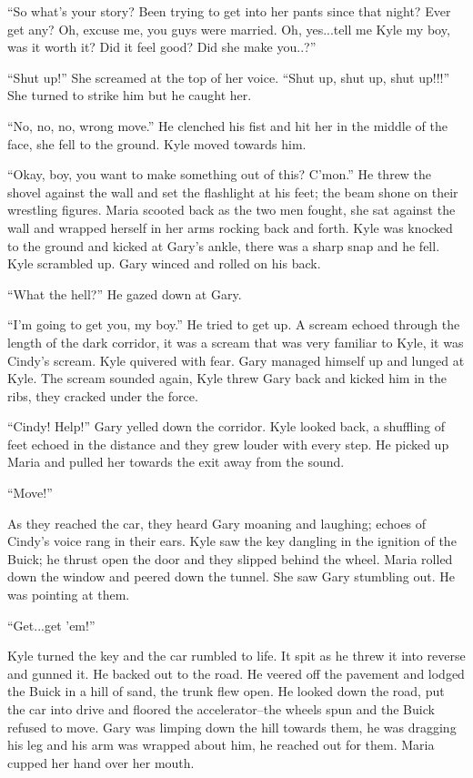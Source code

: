 ``So what's your story? Been trying to get into her pants since that
night? Ever get any? Oh, excuse me, you guys were married. Oh,
yes...tell me Kyle my boy, was it worth it? Did it feel good? Did she
make you..?''

``Shut up!'' She screamed at the top of her voice. ``Shut up, shut up,
shut up!!!'' She turned to strike him but he caught her.

``No, no, no, wrong move.'' He clenched his fist and hit her in the
middle of the face, she fell to the ground. Kyle moved towards him.

``Okay, boy, you want to make something out of this? C'mon.'' He threw
the shovel against the wall and set the flashlight at his feet; the beam
shone on their wrestling figures. Maria scooted back as the two men
fought, she sat against the wall and wrapped herself in her arms rocking
back and forth. Kyle was knocked to the ground and kicked at Gary's
ankle, there was a sharp snap and he fell. Kyle scrambled up. Gary
winced and rolled on his back.

``What the hell?'' He gazed down at Gary.

``I'm going to get you, my boy.'' He tried to get up. A scream echoed
through the length of the dark corridor, it was a scream that was very
familiar to Kyle, it was Cindy's scream. Kyle quivered with fear. Gary
managed himself up and lunged at Kyle. The scream sounded again, Kyle
threw Gary back and kicked him in the ribs, they cracked under the
force.

``Cindy! Help!'' Gary yelled down the corridor. Kyle looked back, a
shuffling of feet echoed in the distance and they grew louder with every
step. He picked up Maria and pulled her towards the exit away from the
sound.

``Move!''

As they reached the car, they heard Gary moaning and laughing; echoes of
Cindy's voice rang in their ears. Kyle saw the key dangling in the
ignition of the Buick; he thrust open the door and they slipped behind
the wheel. Maria rolled down the window and peered down the tunnel. She
saw Gary stumbling out. He was pointing at them.

``Get...get 'em!''

Kyle turned the key and the car rumbled to life. It spit as he threw it
into reverse and gunned it. He backed out to the road. He veered off the
pavement and lodged the Buick in a hill of sand, the trunk flew open. He
looked down the road, put the car into drive and floored the
accelerator--the wheels spun and the Buick refused to move. Gary was
limping down the hill towards them, he was dragging his leg and his arm
was wrapped about him, he reached out for them. Maria cupped her hand
over her mouth.

